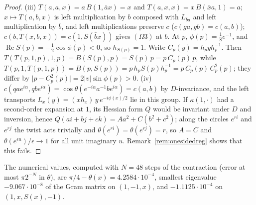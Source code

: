 \documentclass[11pt,reqno]{amsart}
\theoremstyle{definition}
\theoremstyle{remark}
\numberwithin{equation}{section}
\newcommand{\re}{\operatorname{Re}}
\begin{document}
\begin{proof}
(iii) $T(a,a,x)=a\,B(1,\bar ax)=x$ and $T(a,x,x)=x\,B(\bar xa,1)=a$; $x\mapsto T(a,b,x)$ is left multiplication by $b$ composed with $L_{\bar ba}$ and left
multiplication by $\bar b$, and left multiplications preserve $c$ ($c(ga,gb)=c(a,b)$); $c(b,T(x,b,x))=c(1,S(\bar bx))$ gives $(\Omega3)$ at $b$.  At
$p$, $\phi(p)=\frac18e^{-1}$, and $\re S(p)=-\frac12\cos\phi(p)<0$, so $h_{S(p)}=1$.  Write $C_p(y)=h_pyh_p^{-1}$.  Then
$T(T(p,1,p),1,p)=B(S(p),p)=S(p)\,p=p\,C_p(p)\,p$, while $T(p,1,T(p,1,p))=B(p,S(p))=p\,h_pS(p)h_p^{-1}=p\,C_p(p)\,C_p^2(p)$; they differ by
$\lvert p-C_p^2(p)\rvert=2\lvert v\rvert\sin\phi(p)>0$.
(iv) $c(qae^{i\alpha},qbe^{i\alpha})=\cos\theta(e^{-i\alpha}a^{-1}be^{i\alpha})=c(a,b)$ by $D$-invariance, and the left transports
$L_x(y)=(xh_x)\,y\,e^{-i\phi(x)/2}$ lie in this group.  If $\kappa(1,\cdot)$ had a second-order expansion at $1$, its
Hessian form $Q$ would be invariant under $D$ and inversion, hence $Q(ai+bj+ck)=Aa^2+C(b^2+c^2)$; along the circles $e^{ri}$ and $e^{rj}$ the
twist acts trivially and $\theta(e^{ri})=\theta(e^{rj})=r$, so $A=C$ and $\theta(e^{\epsilon u})/\epsilon\to1$ for all unit imaginary $u$.  Remark~\ref{rem:onesidedreg}
shows that this fails.
\end{proof}

The numerical values, computed with $N=48$ steps of the contraction (error at most $\pi2^{-N}$ in $\theta$), are $\pi/4-\theta(x)=4.2584\cdot10^{-4}$, smallest
eigenvalue $-9.067\cdot10^{-8}$ of the Gram matrix on $(1,-1,x)$, and $-1.1125\cdot10^{-4}$ on $(1,x,S(x),-1)$.
\end{document}
